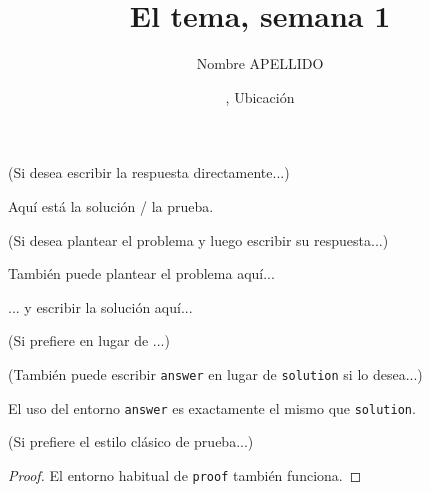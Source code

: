 \documentclass[11pt,
  logo = {example-image},
  title in boldface,
  theorem in new line,
  colored solution,
]{homework}
\title{El tema, semana 1}
\author{Nombre APELLIDO}
\date{\TheDate{2025-01-01}, Ubicación}
\begin{document}
\textcolor{gray!55}{(Si desea escribir la respuesta directamente...)}

\begin{problem}
    Aquí está la solución / la prueba.
\end{problem}


\bigskip\textcolor{gray!55}{(Si desea plantear el problema y luego escribir su respuesta...)}

\begin{problem}
    También puede plantear el problema aquí...
\end{problem}

\begin{solution}
    ... y escribir la solución aquí...
\end{solution}

\bigskip\textcolor{gray!55}{(Si prefiere  en lugar de ...)}



\bigskip\textcolor{gray!55}{(También puede escribir \texttt{answer} en lugar de \texttt{solution} si lo desea...)}

\begin{answer}
    El uso del entorno \verb|answer| es exactamente el mismo que \verb|solution|.
\end{answer}


\bigskip\textcolor{gray!55}{(Si prefiere el estilo clásico de prueba...)}

\begin{proof}
    El entorno habitual de \verb|proof| también funciona.
\end{proof}
\end{document}
